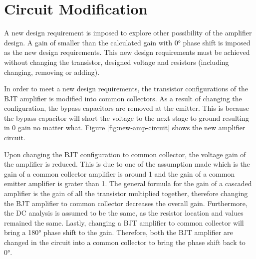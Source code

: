 \documentclass{article}
\begin{document}
\section{Circuit Modification}

A new design requirement is imposed to explore other possibility of the amplifier design.
A gain of smaller than the calculated gain with \ang{0} phase shift is imposed as the new design requirements.
This new design requirements must be achieved without changing the transistor, designed voltage and resistors (including changing, removing or adding).

In order to meet a new design requirements, the transistor configurations of the BJT amplifier is modified into common collectors.
As a result of changing the configuration, the bypass capacitors are removed at the emitter.
This is because the bypass capacitor will short the voltage to the next stage to ground resulting in 0 gain no matter what.
Figure \ref{fig:new-amp-circuit} shows the new amplifier circuit.

Upon changing the BJT configuration to common collector, the voltage gain of the amplifier is reduced.
This is due to one of the assumption made which is the gain of a common collector amplifier is around 1 and the gain of a common emitter amplifier is grater than 1.
The general formula for the gain of a cascaded amplifier is the gain of all the transistor multiplied together, therefore changing the BJT amplifier to common collector decreases the overall gain.
Furthermore, the DC analysis is assumed to be the same, as the resistor location and values remained the same.
Lastly, changing a BJT amplifier to common collector will bring a \ang{180} phase shift to the gain.
Therefore, both the BJT amplifier are changed in the circuit into a common collector to bring the phase shift back to \ang{0}.
\end{document}
